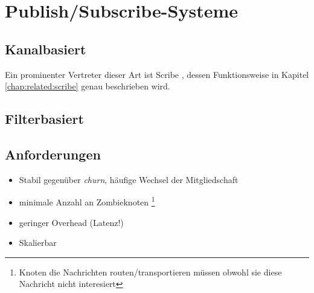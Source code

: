 \section{Publish/Subscribe-Systeme}
\label{chap:grundlagen:pubsub}

\subsection{Kanalbasiert}
Ein prominenter Vertreter dieser Art ist Scribe \cite{citeulike:345316}, dessen Funktionsweise in Kapitel \ref{chap:related:scribe} genau beschrieben wird.

\subsection{Filterbasiert}
\cite{citeulike:854573} %
\cite{citeulike:6674153} %
\cite{citeulike:4291} %

\subsection{Anforderungen}
\begin{itemize}
\item Stabil gegenüber \emph{churn}, häufige Wechsel der Mitgliedschaft
\item minimale Anzahl an Zombieknoten \footnote{Knoten die Nachrichten routen/transportieren müssen obwohl sie diese Nachricht nicht interesiert}
\item geringer Overhead (Latenz!)
\item Skalierbar
\end{itemize}
